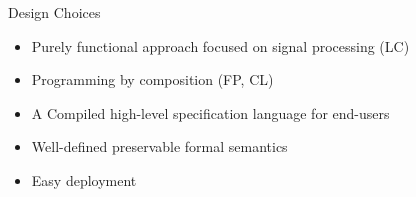 
\begin{frame}{Design Choices}
    \begin{itemize}
        \item Purely functional approach focused on signal processing (LC)
        \item Programming by composition (FP, CL)
        \item A Compiled high-level specification language for end-users
        \item Well-defined preservable formal semantics
        \item Easy deployment
    \end{itemize}
\end{frame}
